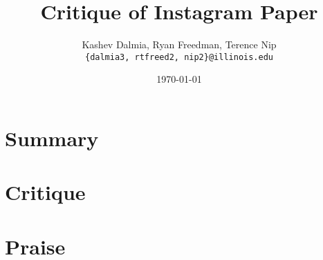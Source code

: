 \documentclass[a4paper]{article}
\title{Critique of Instagram Paper}
\author{Kashev Dalmia, Ryan Freedman, Terence Nip \\
        \texttt{\{dalmia3, rtfreed2, nip2\}@illinois.edu}
       }
\date{\today}
\begin{document}
\maketitle

\section{Summary}

\section{Critique}

\section{Praise}
\end{document}
